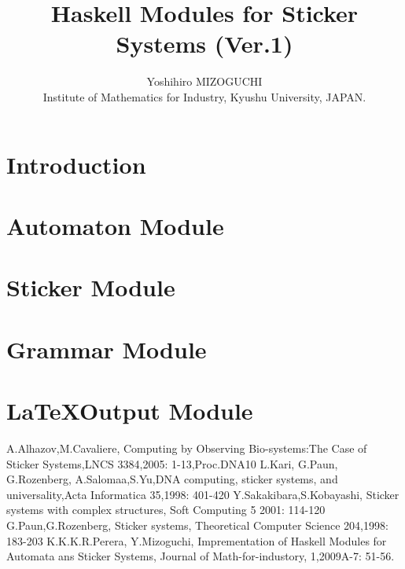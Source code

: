 \documentclass{article}
\begin{document}
\title{Haskell Modules for Sticker Systems (Ver.1)}

\author{Yoshihiro MIZOGUCHI\\
Institute of Mathematics for Industry, Kyushu University, JAPAN.}
\date{}

\maketitle

\tableofcontents

\section{Introduction}


\section{Automaton Module}



\section{Sticker Module}




\section{Grammar Module}




\section{\LaTeX Output Module}




\begin{thebibliography}{99}
A.Alhazov,M.Cavaliere, Computing by Observing Bio-systems:The Case of Sticker Systems,LNCS 3384,2005: 1-13,Proc.DNA10
L.Kari, G.Paun, G.Rozenberg, A.Salomaa,S.Yu,DNA computing, sticker systems, and universality,Acta Informatica 35,1998: 401-420
Y.Sakakibara,S.Kobayashi, Sticker systems with complex structures, Soft Computing 5 2001: 114-120
G.Paun,G.Rozenberg, Sticker systems, Theoretical
	Computer Science 204,1998: 183-203
K.K.K.R.Perera, Y.Mizoguchi,
Imprementation of Haskell Modules for Automata ans Sticker Systems,
Journal of Math-for-industory, 1,2009A-7: 51-56.
\end{thebibliography}
\end{document}
